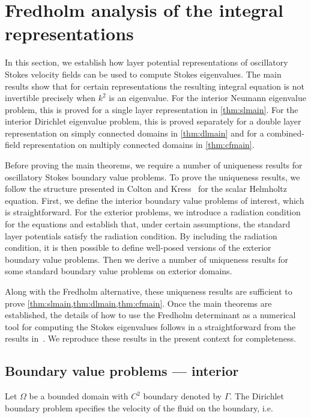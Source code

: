 \section{Fredholm analysis of the integral representations}

In this section, we establish how layer potential
representations of oscillatory Stokes velocity fields
can be used to compute Stokes eigenvalues.
%
The main results show that for certain representations
the resulting integral equation is not invertible precisely
when $k^2$ is an eigenvalue.
%
For the interior Neumann eigenvalue problem, this is proved
for a single layer representation in \cref{thm:slmain}.
%
For the interior Dirichlet eigenvalue problem, this is
proved separately for a double layer representation on
simply connected domains in \cref{thm:dlmain} and
for a combined-field representation on multiply connected
domains in \cref{thm:cfmain}.
%

Before proving the main theorems, we require a number
of uniqueness results for oscillatory Stokes boundary
value problems.
%
To prove the uniqueness results, we follow the 
structure presented in Colton and Kress~\cite[Ch. 3]{colton1983integral}
for the scalar Helmholtz equation.
%
First, we define the interior boundary value problems
of interest, which is straightforward.
%
For the exterior problems, we introduce a radiation condition
for the equations and establish that, under certain assumptions,
the standard layer potentials satisfy the radiation condition.
%
By including the radiation condition, it is then
possible to define well-posed versions of the
exterior boundary value problems.
%
Then we derive a number of uniqueness
results for some standard boundary value problems
on exterior domains.


Along with the Fredholm alternative, these uniqueness
results are sufficient to prove
\cref{thm:slmain,thm:dlmain,thm:cfmain}.
%
Once the main theorems are established,
the details of how to use the Fredholm determinant
as a numerical tool for computing the Stokes eigenvalues
follows in a straightforward from the results
in~\cite{zhao2015robust}.
%
We reproduce these results in the present
context for completeness.

\subsection{Boundary value problems --- interior}

Let $\Omega$ be a bounded domain with $C^2$ boundary
denoted by $\Gamma$.
The Dirichlet boundary problem specifies the
velocity of the fluid on the boundary, i.e.

